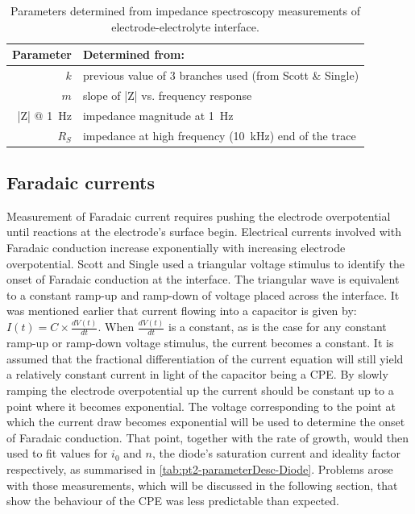     \begin{table}
      \begin{center}
        \begin{tabular} {r | l}
          Parameter & Determined from:\\
          \hline
          $k$ & previous value of 3 branches used (from Scott \& Single)\\
          $m$ & slope of |Z| vs. frequency response\\
          |Z| @ \SI{1}{\hertz} & impedance magnitude at \SI{1}{\hertz}\\
          $R_S$ & impedance at high frequency (\SI{10}{\kilo\hertz}) end of the trace
        \end{tabular}
      \end{center}
      \caption{\label{tab:pt2-parameterDesc-CPE}Parameters determined from impedance spectroscopy measurements of electrode-electrolyte interface.}
    \end{table}


  \subsection{Faradaic currents}
    Measurement of Faradaic current requires pushing the electrode overpotential until reactions at the electrode's surface begin.
    Electrical currents involved with Faradaic conduction increase exponentially with increasing electrode overpotential.
    Scott and Single used a triangular voltage stimulus to identify the onset of Faradaic conduction at the interface.
    The triangular wave is equivalent to a constant ramp-up and ramp-down of voltage placed across the interface.
    It was mentioned earlier that current flowing into a capacitor is given by: $I(t) = C \times \frac{dV(t)}{dt}$.
    When $\frac{dV(t)}{dt}$ is a constant, as is the case for any constant ramp-up or ramp-down voltage stimulus, the current becomes a constant.
    It is assumed that the fractional differentiation of the current equation will still yield a relatively constant current in light of the capacitor being a CPE.
    By slowly ramping the electrode overpotential up the current should be constant up to a point where it becomes exponential.
    The voltage corresponding to the point at which the current draw becomes exponential will be used to determine the onset of Faradaic conduction.
    That point, together with the rate of growth, would then used to fit values for $i_0$ and $n$, the diode's saturation current and ideality factor respectively, as summarised in \cref{tab:pt2-parameterDesc-Diode}.
    Problems arose with those measurements, which will be discussed in the following section, that show the behaviour of the CPE was less predictable than expected.


